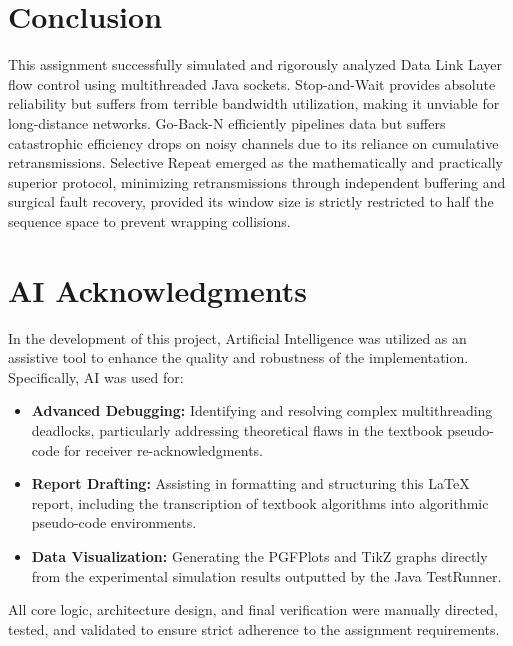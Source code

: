 \documentclass[12pt]{article}
\begin{document}
\section{Conclusion}
This assignment successfully simulated and rigorously analyzed Data Link Layer flow control using multithreaded Java sockets. Stop-and-Wait provides absolute reliability but suffers from terrible bandwidth utilization, making it unviable for long-distance networks. Go-Back-N efficiently pipelines data but suffers catastrophic efficiency drops on noisy channels due to its reliance on cumulative retransmissions. Selective Repeat emerged as the mathematically and practically superior protocol, minimizing retransmissions through independent buffering and surgical fault recovery, provided its window size is strictly restricted to half the sequence space to prevent wrapping collisions.


\section{AI Acknowledgments}
In the development of this project, Artificial Intelligence was utilized as an assistive tool to enhance the quality and robustness of the implementation. Specifically, AI was used for:
\begin{itemize}
    \item \textbf{Advanced Debugging:} Identifying and resolving complex multithreading deadlocks, particularly addressing theoretical flaws in the textbook pseudo-code for receiver re-acknowledgments.
    \item \textbf{Report Drafting:} Assisting in formatting and structuring this LaTeX report, including the transcription of textbook algorithms into algorithmic pseudo-code environments.
    \item \textbf{Data Visualization:} Generating the PGFPlots and TikZ graphs directly from the experimental simulation results outputted by the Java TestRunner.
\end{itemize}
All core logic, architecture design, and final verification were manually directed, tested, and validated to ensure strict adherence to the assignment requirements.
\end{document}
